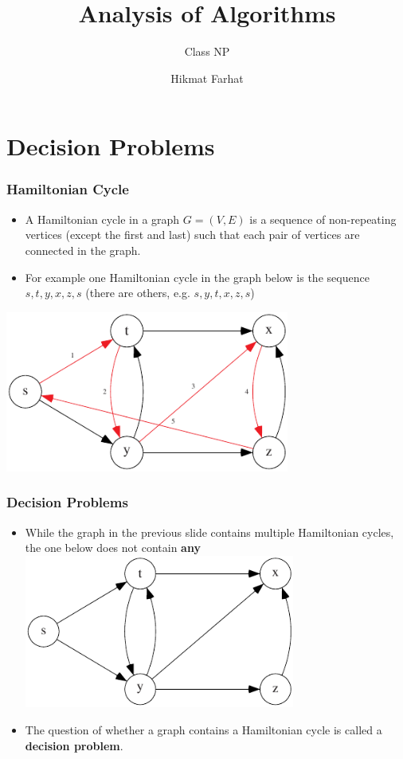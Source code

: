 \documentclass{beamer}
\title{ Analysis of Algorithms}
\subtitle{Class NP}
\author{Hikmat Farhat}
\begin{document}
\frame{\titlepage}

\section{Decision Problems}

\begin{frame}
  \frametitle{Hamiltonian Cycle}
  \begin{itemize}
  \item A Hamiltonian cycle in a graph $G=(V,E)$ is a sequence of non-repeating vertices (except the first and last) such that each pair of vertices are connected in the graph.
  \item For example one Hamiltonian cycle in the graph below is the sequence $s,t,y,x,z,s$ (there are others, e.g.  $s,y,t,x,z,s$)
  \end{itemize}
\includegraphics[width=0.7\textwidth]{np-figs/hamiltonian-example}

\end{frame}



\begin{frame}[fragile]
  \frametitle{Decision Problems}

  \begin{itemize}
 \item While the graph in the previous slide contains multiple Hamiltonian cycles, the one below does not contain \textbf{any}
\includegraphics[width=0.7\textwidth]{np-figs/not-hamiltonian}
\item The question of whether a graph contains a Hamiltonian cycle is called a \textbf{decision problem}.

\end{itemize}
\end{frame}
\end{document}
